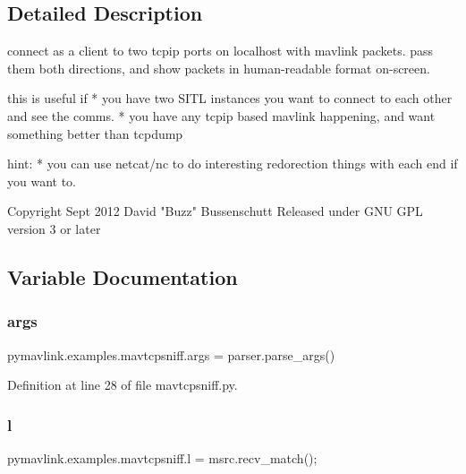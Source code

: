 \subsection{Detailed Description}
\begin{DoxyVerb}connect as a client to two tcpip ports on localhost with mavlink packets.    pass them both directions, and show packets in human-readable format on-screen.

this is useful if
* you have two SITL instances you want to connect to each other and see the comms.
* you have any tcpip based mavlink happening, and want something better than tcpdump

hint:
* you can use netcat/nc to do interesting redorection things with each end if you want to.

Copyright Sept 2012 David "Buzz" Bussenschutt
Released under GNU GPL version 3 or later
\end{DoxyVerb}
 

\subsection{Variable Documentation}
\mbox{\label{namespacepymavlink_1_1examples_1_1mavtcpsniff_a0ad33c6c70d40c78cfbcb6da67f6fe89}} 
\subsubsection{\texorpdfstring{args}{args}}
{\footnotesize\ttfamily pymavlink.\+examples.\+mavtcpsniff.\+args = parser.\+parse\+\_\+args()}



Definition at line 28 of file mavtcpsniff.\+py.

\mbox{\label{namespacepymavlink_1_1examples_1_1mavtcpsniff_a310417b77149af2ebfa7d55cdfebce43}} 
\subsubsection{\texorpdfstring{l}{l}}
{\footnotesize\ttfamily pymavlink.\+examples.\+mavtcpsniff.\+l = msrc.\+recv\+\_\+match();}



